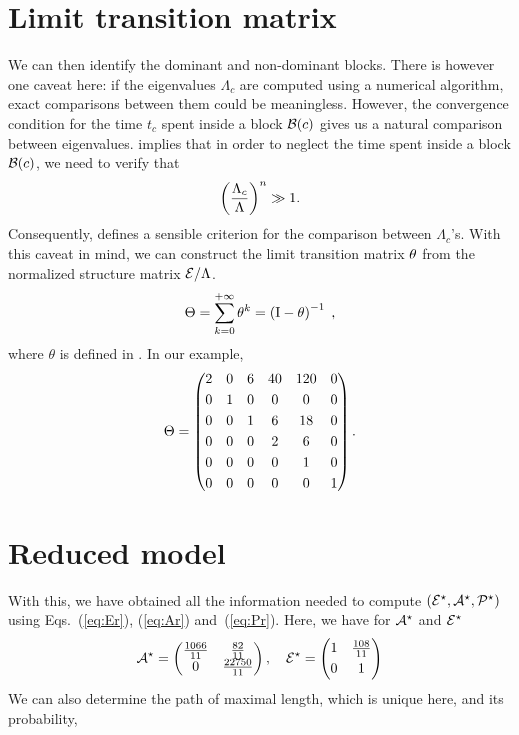 \documentclass{article}
\begin{document}
\section{Limit transition matrix}
%
%
We can then identify the dominant and non-dominant blocks. There is however one caveat
here: if the eigenvalues $\Lambda _c$ are computed using a numerical algorithm, exact comparisons between them
could be meaningless. 
However, the convergence condition for the time $t_c$ spent inside a block $\mathcal B(c)$ gives us a natural comparison between
eigenvalues.
 implies that in order to neglect the time spent inside a block $\mathcal B(c)$, we need to verify that
\begin{equation} \label{eq:neglect}
\left( \frac{\Lambda _c}{\Lambda }\right)^{n} \gg 1.
\end{equation}
Consequently,  defines a sensible criterion for the comparison between $\Lambda _c$'s.  
With this caveat in mind, we can construct the limit transition matrix $\theta$ from the normalized
structure matrix $\mathcal{E}/\Lambda $.
\begin{equation}
 \Theta = \sum _{k=0}^{+\infty } \theta^{k} = \left(\mathrm I - \theta \right)^{-1} \;,
\end{equation}
where $\theta$ is defined in .
In our example,
\begin{equation}
\Theta = \begin{pmatrix}
2& 0& 6& 40& 120& 0\\[0.1cm]
0& 1& 0& 0& 0& 0\\[0.1cm]
0& 0& 1& 6& 18& 0\\[0.1cm]
0& 0& 0& 2& 6& 0\\[0.1cm]
0& 0& 0& 0& 1& 0\\[0.1cm]
0& 0& 0& 0& 0& 1
\end{pmatrix}.
\end{equation}

\section{Reduced model}
With this, we have obtained all the information needed 
to compute $\left(\mathcal{E}^{\star},\mathcal{A}^{\star},\mathcal{P}^{\star}\right)$ using Eqs.~(\ref{eq:Er}), (\ref{eq:Ar}) and~(\ref{eq:Pr}).
Here, we have for $\mathcal{A}^{\star}$ and $\mathcal{E}^{\star}$
%
\begin{equation}
\mathcal{A}^{\star}= \begin{pmatrix}
\frac{1066}{11}& \frac{82}{11}\\
0& \frac{22750}{11}
\end{pmatrix} ,\quad  \mathcal{E}^{\star} = \begin{pmatrix}
1& \frac{108}{11}\\[0.1cm]
0& 1
\end{pmatrix}
\end{equation}
We can also determine the path of maximal length, which is unique here, and its probability,
\end{document}
